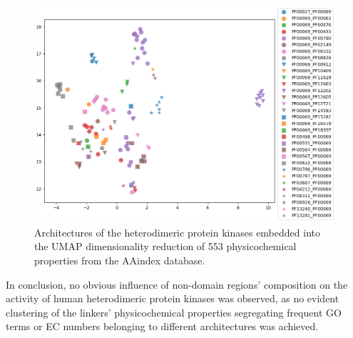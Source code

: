 	\begin{figure}
		\centering
		\includegraphics[width=0.9\linewidth]{img/aa_umap_arch.png}
		\caption{Architectures of the heterodimeric protein kinases embedded into the UMAP
		dimensionality reduction of 553 physicochemical properties from the AAindex database.}
		\label{fig:aa_umap}
	\end{figure}

	In conclusion, no obvious influence of non-domain regions' composition on the activity
	of human heterodimeric protein kinases was observed, as no evident clustering of the
	linkers' physicochemical properties segregating frequent GO terms or EC numbers
	belonging to different architectures was achieved.

